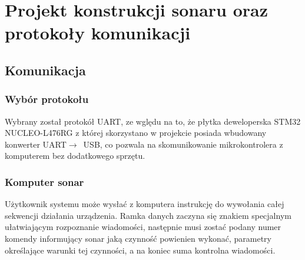 \chapter[Projekt konstrukcji sonaru oraz protokoły komunikacji]{Projekt konstrukcji sonaru oraz protokoły komunikacji}

\label{konstrukcja}


\section{Komunikacja}

\subsection{Wybór protokołu}

Wybrany został protokół UART, ze wględu na to, że płytka deweloperska STM32 NUCLEO-L476RG 
z której skorzystano w projekcie posiada wbudowany konwerter UART$\rightarrow$~USB, 
co pozwala na skomunikowanie mikrokontrolera z komputerem bez dodatkowego sprzętu.

\subsection{Komputer \textrightarrow{} sonar}
Użytkownik systemu może wysłać z komputera instrukcję do wywołania całej sekwencji działania urządzenia. 
Ramka danych zaczyna się znakiem specjalnym ułatwiającym rozpoznanie wiadomości, 
następnie musi zostać podany numer komendy informujący sonar jaką czynność powienien wykonać, 
parametry określające warunki tej czynności, a na koniec suma kontrolna wiadomości.

